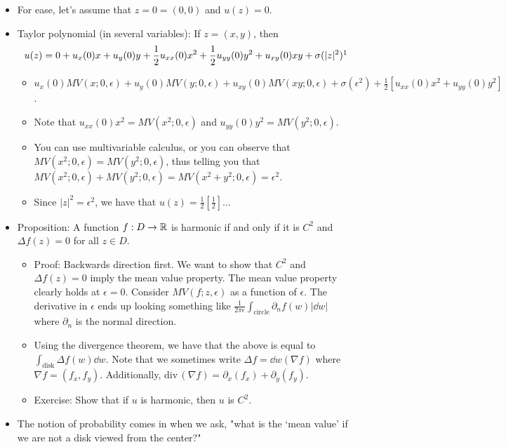 \documentclass[../main.tex]{subfiles}
\begin{document}
\begin{itemize}
    \item For ease, let's assume that $z=0=(0,0)$ and $u(z)=0$.
    \item Taylor polynomial (in several variables): If $z=(x,y)$, then
    \begin{equation*}
        u(z) = 0+u_x(0)x+u_y(0)y+\frac{1}{2}u_{xx}(0)x^2+\frac{1}{2}u_{yy}(0)y^2+u_{xy}(0)xy+\sigma(|z|^2)\footnotemark
    \end{equation*}
    \begin{itemize}
        \item $u_x(0)MV(x;0,\epsilon)+u_y(0)MV(y;0,\epsilon)+u_{xy}(0)MV(xy;0,\epsilon)+\sigma(\epsilon^2)+\frac{1}{2}[u_{xx}(0)x^2+u_{yy}(0)y^2]$.
        \item Note that $u_{xx}(0)x^2=MV(x^2;0,\epsilon)$ and $u_{yy}(0)y^2=MV(y^2;0,\epsilon)$.
        \item You can use multivariable calculus, or you can observe that $MV(x^2;0,\epsilon)=MV(y^2;0,\epsilon)$, thus telling you that $MV(x^2;0,\epsilon)+MV(y^2;0,\epsilon)=MV(x^2+y^2;0,\epsilon)=\epsilon^2$.
        \item Since $|z|^2=\epsilon^2$, we have that $u(z)=\frac{1}{2}[\frac{1}{2}]$...
    \end{itemize}
    \item Proposition: A function $f:D\to\mathbb{R}$ is harmonic if and only if it is $C^2$ and $\Delta f(z)=0$ for all $z\in D$.
    \begin{itemize}
        \item Proof: Backwards direction first. We want to show that $C^2$ and $\Delta f(z)=0$ imply the mean value property. The mean value property clearly holds at $\epsilon=0$. Consider $MV(f;z,\epsilon)$ as a function of $\epsilon$. The derivative in $\epsilon$ ends up looking something like $\frac{1}{2\pi\epsilon}\int_\text{circle}\partial_nf(w)|\dd{w}|$ where $\partial_n$ is the normal direction.
        \item Using the divergence theorem, we have that the above is equal to $\int_\text{disk}\Delta f(w)\dd{w}$. Note that we sometimes write $\Delta f=\dd{w}(\nabla f)$ where $\nabla f=(f_x,f_y)$. Additionally, $\text{div}\,(\nabla f)=\partial_x(f_x)+\partial_y(f_y)$.
        \item Exercise: Show that if $u$ is harmonic, then $u$ is $C^2$.
    \end{itemize}
    \item The notion of probability comes in when we ask, "what is the `mean value' if we are not a disk viewed from the center?"
\end{itemize}
\end{document}
